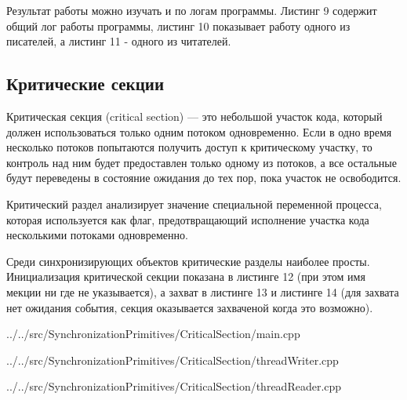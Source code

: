 \documentclass[a4paper, 12pt]{article}		%
\begin{document}
Результат работы можно изучать и по логам программы. Листинг 9 содержит общий лог работы программы, листинг 10 показывает работу одного из писателей, а листинг 11 - одного из читателей.


\newpage





\newpage
\subsection{Критические секции}

Критическая секция (critical section) — это небольшой участок кода, который должен использоваться только одним потоком одновременно. Если в одно время несколько потоков попытаются получить доступ к критическому участку, то контроль над ним будет предоставлен только одному из потоков, а все остальные будут переведены в состояние ожидания до тех пор, пока участок не освободится.

Критический раздел анализирует значение специальной переменной процесса, которая используется как флаг, предотвращающий исполнение участка кода несколькими потоками одновременно.

Среди синхронизирующих объектов критические разделы наиболее просты. Инициализация критической секции показана в листинге 12 (при этом имя мекции ни где не указывается), а захват в листинге 13 и листинге 14 (для захвата нет ожидания события, секция оказывается захваченой когда это возможно).


{../../src/SynchronizationPrimitives/CriticalSection/main.cpp}


{../../src/SynchronizationPrimitives/CriticalSection/threadWriter.cpp}

\newpage

{../../src/SynchronizationPrimitives/CriticalSection/threadReader.cpp}
\end{document}
